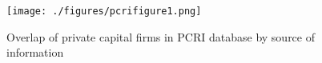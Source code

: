 
\begin{figure}[tb]
    \centering
\texttt{[image: ./figures/pcrifigure1.png]}
\caption{Overlap of private capital firms in PCRI database by source of information\label{fig:pcrifigure1}}
\end{figure}
